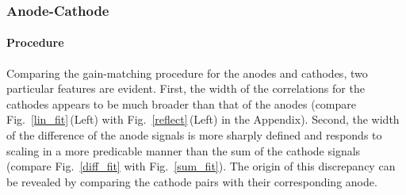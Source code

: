 \subsubsection{Anode-Cathode}
\paragraph{Procedure}
Comparing the gain-matching procedure for the anodes and cathodes, two particular features are evident. First, the width of the correlations  for the cathodes appears to be much broader than that of the anodes (compare Fig.~\ref{lin_fit}\,(Left) with Fig.~\ref{reflect}\,(Left) in the Appendix).  Second, the width of the difference of the anode signals is more sharply defined and responds to scaling in a more predicable manner than the sum of the cathode signals (compare Fig.~\ref{diff_fit} with Fig.~\ref{sum_fit}).  The origin of this discrepancy can be revealed by comparing the cathode pairs with their corresponding anode. 

